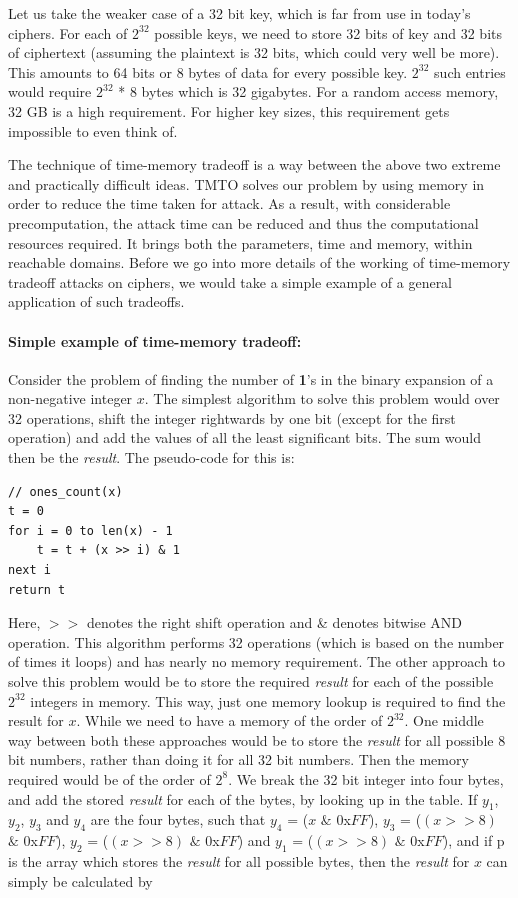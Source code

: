 Let us take the weaker case of a 32 bit key, which is far from use in today's ciphers. For each of $2^{32}$ possible keys, we need to store 32 bits of key and 32 bits of ciphertext (assuming the plaintext is 32 bits, which could very well be more). This amounts to 64 bits or 8 bytes of data for every possible key. $2^{32}$ such entries would require $2^{32}$ * 8 bytes which is 32 gigabytes. For a random access memory, 32 GB is a high requirement. For higher key sizes, this requirement gets impossible to even think of.

The technique of time-memory tradeoff is a way between the above two extreme and practically difficult ideas. TMTO solves our problem by using memory in order to reduce the time taken for attack. As a result, with considerable precomputation, the attack time can be reduced and thus the computational resources required. It brings both the parameters, time and memory, within reachable domains. Before we go into more details of the working of time-memory tradeoff attacks on ciphers, we would take a simple example of a general application of such tradeoffs.

\paragraph{Simple example of time-memory tradeoff:} Consider the problem of finding the number of \textbf{1}'s in the binary expansion of a non-negative integer $x$. The simplest algorithm to solve this problem would over 32 operations, shift the integer rightwards by one bit (except for the first operation) and add the values of all the least significant bits. The sum would then be the \emph{result}. The pseudo-code for this is:

\begin{verbatim}
// ones_count(x)
t = 0
for i = 0 to len(x) - 1
    t = t + (x >> i) & 1
next i
return t
\end{verbatim}

Here, $>>$ denotes the right shift operation and \& denotes bitwise AND operation. This algorithm performs 32 operations (which is based on the number of times it loops) and has nearly no memory requirement. The other approach to solve this problem would be to store the required \emph{result} for each of the possible $2^{32}$ integers in memory. This way, just one memory lookup is required to find the result for $x$. While we need to have a memory of the order of $2^{32}$. One middle way between both these approaches would be to store the \textit{result} for all possible 8 bit numbers, rather than doing it for all 32 bit numbers. Then the memory required would be of the order of $2^{8}$. We break the 32 bit integer into four bytes, and add the stored \textit{result} for each of the bytes, by looking up in the table. If $y_1$, $y_2$, $y_3$ and $y_4$ are the four bytes, such that $y_4$ = ($x$ $\&$ $0$x$FF$), $y_3$ = ($(x >> 8)$ $\&$ $0$x$FF$), $y_2$ = ($(x >> 8)$ $\&$ $0$x$FF$) and $y_1$ = ($(x >> 8)$ $\&$ $0$x$FF$), and if p is the array which stores the \textit{result} for all possible bytes, then the \textit{result} for $x$ can simply be calculated by

